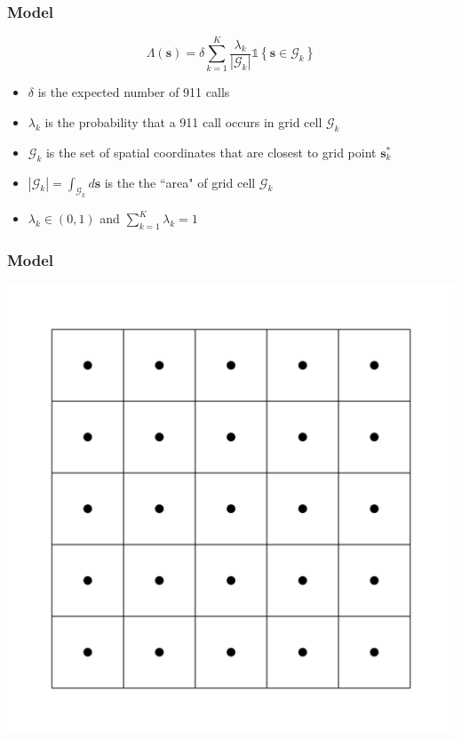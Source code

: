 \documentclass[10pt, compress]{beamer}
\begin{document}
  \begin{frame}
    \frametitle{Model}
    $$ \Lambda(\mathbf{s}) = \delta \sum_{k=1}^K \frac{\lambda_k}{|\mathcal{G}_k|} \mathds{1} \left\{ \mathbf{s} \in \mathcal{G}_k \right\} $$
    \begin{itemize}
      \item $\delta$ is the expected number of 911 calls
      \item $\lambda_k$ is the probability that a 911 call occurs in grid cell $\mathcal{G}_k$
      \item $\mathcal{G}_k$ is the set of spatial coordinates that are closest to grid point $\mathbf{s}_k^{*}$
      \item $|\mathcal{G}_k| = \int_{\mathcal{G}_k}d\mathbf{s}$ is the the ``area" of grid cell $\mathcal{G}_k$
      \item $\lambda_k \in (0,1)$ and $\sum_{k=1}^K \lambda_k = 1$
    \end{itemize}
  \end{frame}
  \begin{frame}
    \frametitle{Model}
    \centering
    \includegraphics[height=0.8\textheight]{blank_grid.pdf}
  \end{frame}
\end{document}
